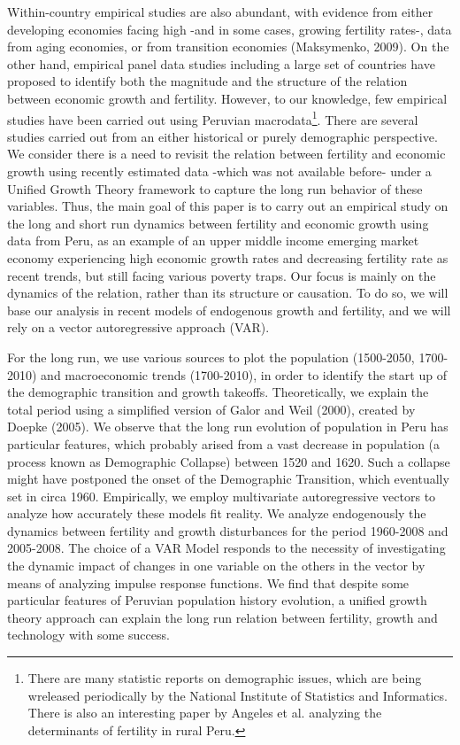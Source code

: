 \documentclass[12pt]{article}%
\begin{document}
Within-country empirical studies are also abundant, with evidence from either developing economies facing high -and in some cases, growing fertility rates-, data from aging economies, or from transition economies (Maksymenko, 2009). On the other hand, empirical panel data studies including a large set of countries have proposed to identify both the magnitude and the structure of the relation between economic growth and fertility. However, to our knowledge, few empirical studies have been carried out using Peruvian macrodata\footnote{There are many statistic reports on demographic issues, which are being wreleased periodically by the National Institute of Statistics and Informatics. There is also an interesting paper by Angeles et al. analyzing the determinants of fertility in rural Peru.}. There are several studies carried out from an either historical or purely demographic perspective. We consider there is a need to revisit the relation between fertility and economic growth using recently estimated data -which was not available before- under a Unified Growth Theory framework to capture the long run behavior of these variables. Thus, the main goal of this paper is to carry out an empirical study on the long and short run dynamics between fertility and economic growth using data from Peru, as an example of an upper middle income emerging market economy experiencing high economic growth rates and decreasing fertility rate as recent trends, but still facing various poverty traps. Our focus is mainly on the dynamics of the relation, rather than its structure or causation. To do so, we will base our analysis in recent models of endogenous growth and fertility, and we will rely on a vector autoregressive approach (VAR).

For the long run, we use various sources to plot the population (1500-2050, 1700-2010) and macroeconomic trends (1700-2010), in order to identify the start up of the demographic transition and growth takeoffs. Theoretically, we explain the total period using a simplified version of Galor and Weil (2000), created by Doepke (2005). We observe that the long run evolution of population in Peru has particular features, which probably arised from a vast decrease in population (a process known as Demographic Collapse) between 1520 and 1620. Such a collapse might have postponed the onset of the Demographic Transition, which eventually set in circa 1960. Empirically,  we employ multivariate autoregressive vectors to analyze how accurately these models fit reality. We analyze endogenously the dynamics between fertility and growth disturbances for the period 1960-2008 and 2005-2008. The choice of a VAR Model responds to the necessity of investigating the dynamic impact of changes in one variable on the others in the vector by means of analyzing impulse response functions. We find that despite some particular features of Peruvian population history evolution, a unified growth theory approach can explain the long run relation between fertility, growth and technology with some success.
\end{document}
